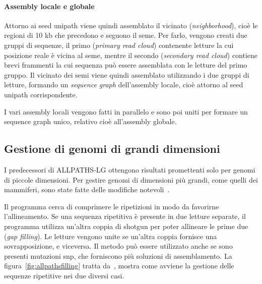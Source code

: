 \documentclass[crop=false, class=book]{standalone}
\begin{document}
	\paragraph{Assembly locale e globale}
	Attorno ai seed unipath viene quindi assemblato il vicinato (\textit{neighborhood}), cioè le regioni di 10 kb che precedono e seguono il seme. Per farlo, vengono creati due gruppi di sequenze, il primo (\textit{primary read cloud}) contenente letture la cui posizione reale è vicina al seme, mentre il secondo (\textit{secondary read cloud}) contiene brevi frammenti la cui sequenza può essere assemblata con le letture del primo gruppo. Il vicinato dei semi viene quindi assemblato utilizzando i due gruppi di letture, formando un \textit{sequence graph} dell'assembly locale, cioè attorno al seed unipath corrispondente.
	
	I vari assembly locali vengono fatti in parallelo e sono poi uniti per formare un sequence graph unico, relativo cioè all'assembly globale.
	
	
	\subsection{Gestione di genomi di grandi dimensioni}
	I predecessori di ALLPATHS-LG ottengono risultati promettenti solo per genomi di piccole dimensioni. Per gestire genomi di dimensioni più grandi, come quelli dei mammiferi, sono state fatte delle modifiche notevoli~\cite{gnerre2011high}.

	Il programma cerca di comprimere le ripetizioni in modo da favorirne l'allineamento. Se una sequenza ripetitiva è presente in due letture separate, il programma utilizza un'altra coppia di shotgun per poter allineare le prime due (\textit{gap filling}). Le letture vengono unite se un'altra coppia fornisce una sovrapposizione, e viceversa. Il metodo può essere utilizzato anche se sono presenti mutazioni \gls{snp}, che forniscono più soluzioni di assemblamento. La figura~\vref{fig:allpathsfilling} tratta da~\cite{gnerre2011high}, mostra come avviene la gestione delle sequenze ripetitive nei due diversi casi.
\end{document}
